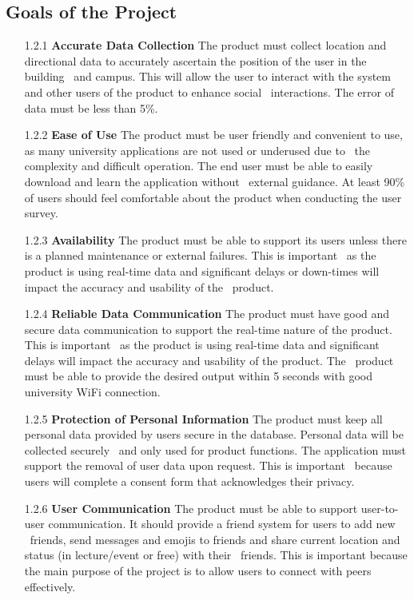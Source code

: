 \documentclass[12pt]{article}
\begin{document}
\subsection{Goals of the Project}
\begin{itemize}
  \item[1.2.1] \textbf{Accurate Data Collection}
  The product must collect location and directional data to accurately ascertain the position of the user in the building \
  and campus. This will allow the user to interact with the system and other users of the product to enhance social \
  interactions. The error of data must be less than 5\%.

  \item[1.2.2] \textbf{Ease of Use}
  The product must be user friendly and convenient to use, as many university applications are not used or underused due to \
  the complexity and difficult operation. The end user must be able to easily download and learn the application without \
  external guidance. At least 90\% of users should feel comfortable about the product when conducting the user survey.

  \item[1.2.3] \textbf{Availability}
  The product must be able to support its users unless there is a planned maintenance or external failures. This is important \
  as the product is using real-time data and significant delays or down-times will impact the accuracy and usability of the \
  product.

  \item[1.2.4] \textbf{Reliable Data Communication}
  The product must have good and secure data communication to support the real-time nature of the product. This is important \
  as the product is using real-time data and significant delays will impact the accuracy and usability of the product. The \
  product must be able to provide the desired output within 5 seconds with good university WiFi connection.

  \item[1.2.5] \textbf{Protection of Personal Information}
  The product must keep all personal data provided by users secure in the database. Personal data will be collected securely \
  and only used for product functions. The application must support the removal of user data upon request. This is important \
  because users will complete a consent form that acknowledges their privacy.

  \item[1.2.6] \textbf{User Communication}
  The product must be able to support user-to-user communication. It should provide a friend system for users to add new \
  friends, send messages and emojis to friends and share current location and status (in lecture/event or free) with their \
  friends. This is important because the main purpose of the project is to allow users to connect with peers effectively.


\end{itemize}
\end{document}
